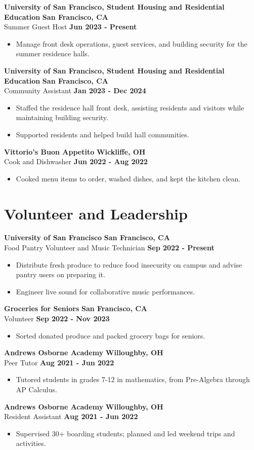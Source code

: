 \documentclass[letterpaper]{article}
\newenvironment{entry}[4]{%
  \textbf{#1} \hfill \textbf{#2} \\
  #3 \hfill \textbf{#4}
  \begin{itemize}
}{%
  \end{itemize}
  \medskip
}
\begin{document}
\begin{entry}{University of San Francisco, Student Housing and Residential Education}
  {San Francisco, CA}
  {Summer Guest Host}{Jun 2023 - Present}
  \item Manage front desk operations, guest services, and building security
    for the summer residence halls.
\end{entry}

\begin{entry}{University of San Francisco, Student Housing and Residential Education}
  {San Francisco, CA}
  {Community Assistant}{Jan 2023 - Dec 2024}
  \item Staffed the residence hall front desk, assisting residents and
    visitors while maintaining building security.
  \item Supported residents and helped build hall communities.
\end{entry}

\begin{entry}{Vittorio's Buon Appetito}{Wickliffe, OH}
  {Cook and Dishwasher}{Jun 2022 - Aug 2022}
  \item Cooked menu items to order, washed dishes, and kept the kitchen
    clean.
\end{entry}

\section*{Volunteer and Leadership}

\begin{entry}{University of San Francisco}{San Francisco, CA}
  {Food Pantry Volunteer and Music Technician}{Sep 2022 - Present}
  \item Distribute fresh produce to reduce food insecurity on campus and
    advise pantry users on preparing it.
  \item Engineer live sound for collaborative music performances.
\end{entry}

\begin{entry}{Groceries for Seniors}{San Francisco, CA}
  {Volunteer}{Sep 2022 - Nov 2023}
  \item Sorted donated produce and packed grocery bags for seniors.
\end{entry}

\begin{entry}{Andrews Osborne Academy}{Willoughby, OH}
  {Peer Tutor}{Aug 2021 - Jun 2022}
  \item Tutored students in grades 7-12 in mathematics, from Pre-Algebra
    through AP Calculus.
\end{entry}

\begin{entry}{Andrews Osborne Academy}{Willoughby, OH}
  {Resident Assistant}{Aug 2021 - Jun 2022}
  \item Supervised 30+ boarding students; planned and led weekend trips and
    activities.
\end{entry}
\end{document}
